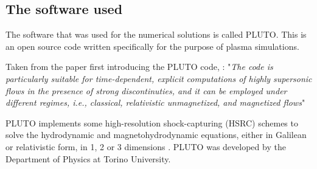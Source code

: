 \subsection*{The software used}

The software that was used for the numerical solutions is called PLUTO. 
This is an open source code written specifically for the purpose of plasma simulations. 

Taken from the paper first introducing the PLUTO code, \cite{pluto-paper}:
"\emph{The code is particularly suitable for time-dependent, explicit computations of highly supersonic flows in the presence of strong discontinuties, and it can be employed under different regimes, i.e., classical, relativistic unmagnetized, and magnetized flows}"

PLUTO implements some high-resolution shock-capturing (HSRC) schemes to solve the hydrodynamic and magnetohydrodynamic equations, either in Galilean or relativistic form, in 1, 2 or 3 dimensions \cite{pluto-paper}.
PLUTO was developed by the Department of Physics at Torino University.  \cite{pluto-manual}


